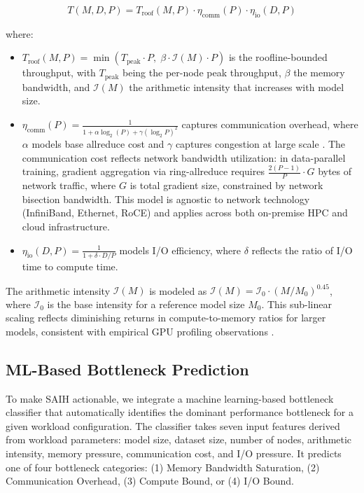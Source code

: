 \documentclass{llncs}
\begin{document}
\begin{equation}
T(M, D, P) = T_{\text{roof}}(M, P) \cdot \eta_{\text{comm}}(P) \cdot \eta_{\text{io}}(D, P)
\label{eq:throughput}
\end{equation}

where:

\begin{itemize}
    \item $T_{\text{roof}}(M, P) = \min\left(T_{\text{peak}} \cdot P,\; \beta \cdot \mathcal{I}(M) \cdot P\right)$ is the roofline-bounded throughput, with $T_{\text{peak}}$ being the per-node peak throughput, $\beta$ the memory bandwidth, and $\mathcal{I}(M)$ the arithmetic intensity that increases with model size.
    \item $\eta_{\text{comm}}(P) = \frac{1}{1 + \alpha \log_2(P) + \gamma (\log_2 P)^2}$ captures communication overhead, where $\alpha$ models base allreduce cost and $\gamma$ captures congestion at large scale \cite{Thakur2005Allreduce}. The communication cost reflects network bandwidth utilization: in data-parallel training, gradient aggregation via ring-allreduce requires $\frac{2(P-1)}{P} \cdot G$ bytes of network traffic, where $G$ is total gradient size, constrained by network bisection bandwidth. This model is agnostic to network technology (InfiniBand, Ethernet, RoCE) and applies across both on-premise HPC and cloud infrastructure.
    \item $\eta_{\text{io}}(D, P) = \frac{1}{1 + \delta \cdot D/P}$ models I/O efficiency, where $\delta$ reflects the ratio of I/O time to compute time.
\end{itemize}

The arithmetic intensity $\mathcal{I}(M)$ is modeled as $\mathcal{I}(M) = \mathcal{I}_0 \cdot (M/M_0)^{0.45}$, where $\mathcal{I}_0$ is the base intensity for a reference model size $M_0$. This sub-linear scaling reflects diminishing returns in compute-to-memory ratios for larger models, consistent with empirical GPU profiling observations \cite{Jia2018}.

\subsection{ML-Based Bottleneck Prediction}

To make SAIH actionable, we integrate a machine learning-based bottleneck classifier that automatically identifies the dominant performance bottleneck for a given workload configuration. The classifier takes seven input features derived from workload parameters: model size, dataset size, number of nodes, arithmetic intensity, memory pressure, communication cost, and I/O pressure. It predicts one of four bottleneck categories: (1) Memory Bandwidth Saturation, (2) Communication Overhead, (3) Compute Bound, or (4) I/O Bound.
\end{document}

